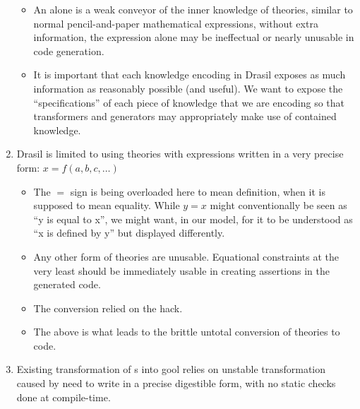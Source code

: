 \begin{enumerate}
\begin{itemize}
		      \item An \Expr{} alone is a weak conveyor of the inner knowledge
		            of theories, similar to normal pencil-and-paper mathematical
		            expressions, without extra information, the expression alone
		            may be ineffectual or nearly unusable in code generation.

		      \item It is important that each knowledge encoding in Drasil
		            exposes as much information as reasonably possible (and
		            useful). We want to expose the ``specifications'' of each
		            piece of knowledge that we are encoding so that transformers
		            and generators may appropriately make use of contained
		            knowledge.

	      \end{itemize}

	\item Drasil is limited to using theories with expressions written in a very
	      precise form: \(x = f(a, b, c, \ldots{})\) 

	      \begin{itemize}

		      \item The \(=\) sign is being overloaded here to mean definition,
		            when it is supposed to mean equality. While \(y = x\) might
		            conventionally be seen as ``y is equal to x'', we might
		            want, in our model, for it to be understood as ``x is
		            defined by y'' but displayed differently.

		      \item Any other form of theories are unusable. Equational
		            constraints at the very least should be immediately usable
		            in creating assertions in the generated code.

		      \item The conversion relied on the  hack.

		      \item The above is what leads to the brittle untotal conversion of
		            theories to code.

	      \end{itemize}

	\item Existing transformation of \RelationConcept{}s into \acs{gool} relies
	      on unstable transformation caused by need to write in a precise
	      digestible form, with no static checks done at compile-time.

\end{enumerate}

